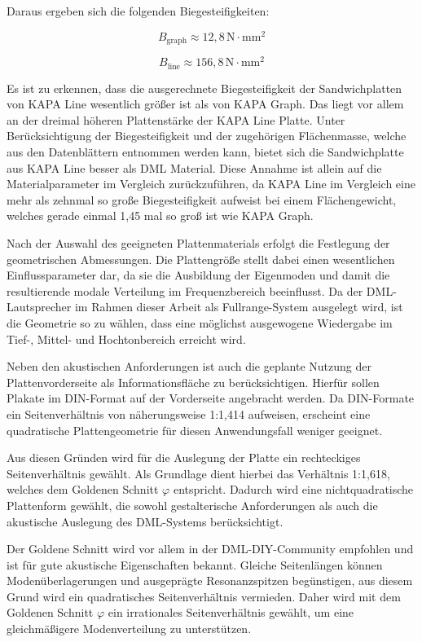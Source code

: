 Daraus ergeben sich die folgenden Biegesteifigkeiten:

\begin{equation}
B_{\text{graph}} \approx 12{,}8 \, \text{N} \cdot \text{mm}^2
\end{equation}

\begin{equation}
B_{\text{line}} \approx 156{,}8 \, \text{N} \cdot \text{mm}^2
\end{equation}

Es ist zu erkennen, dass die ausgerechnete Biegesteifigkeit der Sandwichplatten von KAPA Line wesentlich größer ist als von KAPA Graph. Das liegt vor allem an der dreimal höheren Plattenstärke der KAPA Line Platte. Unter Berücksichtigung der Biegesteifigkeit und der zugehörigen Flächenmasse, welche aus den Datenblättern entnommen werden kann, bietet sich die Sandwichplatte aus KAPA Line besser als DML Material. Diese Annahme ist allein auf die Materialparameter im Vergleich zurückzuführen, da KAPA Line im Vergleich eine mehr als zehnmal so große Biegesteifigkeit aufweist bei einem Flächengewicht, welches gerade einmal 1,45 mal so groß ist wie KAPA Graph.

Nach der Auswahl des geeigneten Plattenmaterials erfolgt die Festlegung der geometrischen Abmessungen. Die Plattengröße stellt dabei einen wesentlichen Einflussparameter dar, da sie die Ausbildung der Eigenmoden und damit die resultierende modale Verteilung im Frequenzbereich beeinflusst. Da der DML-Lautsprecher im Rahmen dieser Arbeit als Fullrange-System ausgelegt wird, ist die Geometrie so zu wählen, dass eine möglichst ausgewogene Wiedergabe im Tief-, Mittel- und Hochtonbereich erreicht wird.

Neben den akustischen Anforderungen ist auch die geplante Nutzung der Plattenvorderseite als Informationsfläche zu berücksichtigen. Hierfür sollen Plakate im DIN-Format auf der Vorderseite angebracht werden. Da DIN-Formate ein Seitenverhältnis von näherungsweise 1:1,414 aufweisen, erscheint eine quadratische Plattengeometrie für diesen Anwendungsfall weniger geeignet.

Aus diesen Gründen wird für die Auslegung der Platte ein rechteckiges Seitenverhältnis gewählt. Als Grundlage dient hierbei das Verhältnis 1:1,618, welches dem Goldenen Schnitt $\varphi$ entspricht. Dadurch wird eine nichtquadratische Plattenform gewählt, die sowohl gestalterische Anforderungen als auch die akustische Auslegung des DML-Systems berücksichtigt.

Der Goldene Schnitt wird vor allem in der DML-DIY-Community empfohlen und ist für gute akustische Eigenschaften bekannt.
Gleiche Seitenlängen können Modenüberlagerungen und ausgeprägte Resonanzspitzen begünstigen, aus diesem Grund wird ein quadratisches Seitenverhältnis vermieden. Daher wird mit dem Goldenen Schnitt $\varphi$ ein irrationales Seitenverhältnis gewählt, um eine gleichmäßigere Modenverteilung zu unterstützen.

